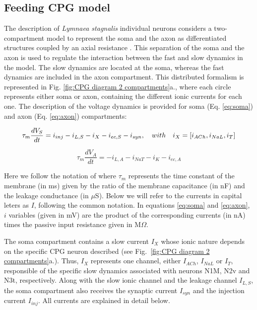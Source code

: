 \subsection{Feeding CPG model}
\label{sec:CPG model equations}
The \textcite{vavoulis_dynamic_2007} description of {\sl Lymnaea stagnalis} individual neurons considers a two-compartment model to represent the soma and the axon as  differentiated structures coupled by an axial resistance \parencite{vavoulis_dynamic_2007}. This separation of the soma and the axon is used to regulate the interaction between the fast and slow dynamics in the model. The slow dynamics are located at the soma, whereas the fast dynamics are included in the axon compartment. This distributed formalism is represented in Fig. \ref{fig:CPG diagram 2 compartments}a., where each circle represents either soma or axon, containing the different ionic currents for each one. The description of the voltage dynamics is provided for soma (Eq. \ref{eq:soma}) and axon (Eq. \ref{eq:axon}) compartments:

\begin{equation}
	\tau_m\frac{dV_S}{dt} = i_{inj} - i_{L,S} - i_X - i_{ec,S} - i_{syn} \\,
	\quad with \quad i_X = [i_{ACh},i_{NaL},i_T]
	\label{eq:soma}
\end{equation}

\begin{equation}
	\tau_m\frac{dV_A}{dt} = -i_{L,A} - i_{NaT} - i_K - i_{ec,A}
	\label{eq:axon}
\end{equation}

\noindent Here we follow the notation of \textcite{vavoulis_dynamic_2007} where $\tau_m$ represents the time constant of the membrane (in ms) given by the ratio of the membrane capacitance (in nF) and the leakage conductance (in $\mu$S). Below we will refer to the currents in capital leters as $I$, following the common notation. In equations \ref{eq:soma} and \ref{eq:axon}, $i$ variables (given in mV) are the product of the corresponding currents (in nA) times the passive input resistance given in M$\Omega$.

The soma compartment contains a slow current $I_X$ whose ionic nature depends on the specific CPG neuron described (see Fig.~\ref{fig:CPG diagram 2 compartments}a.). Thus, $I_X$  represents one channel, either $I_{ACh}$, $I_{NaL}$ or $I_{T}$, responsible of the specific slow dynamics associated with neurons N1M, N2v and N3t, respectively.  Along with the slow ionic channel and the leakage channel  $I_{L,S}$, the soma compartment also receives the synaptic current $I_{syn}$ and the injection current $I_{inj}$. All currents are explained in detail below.


